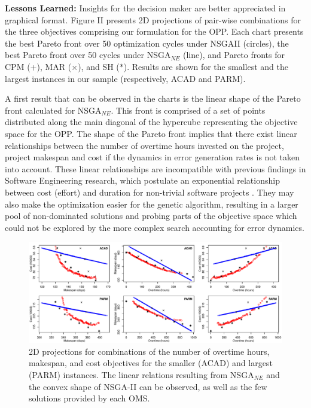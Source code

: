 \documentclass[conference]{IEEEtran}
\begin{document}
\noindent
\textbf{Lessons Learned:} Insights for the decision maker are better appreciated in graphical format. Figure II presents 2D projections of pair-wise combinations for the three objectives comprising our formulation for the OPP. Each chart presents the best Pareto front over 50 optimization cycles under NSGAII (circles), the best Pareto front over 50 cycles under NSGA$_{NE}$ (line), and Pareto fronts for CPM (+), MAR ($\times$), and SH ($\ast$). Results are shown for the smallest and the largest instances in our sample (respectively, ACAD and PARM).

A first result that can be observed in the charts is the linear shape of the Pareto front calculated for NSGA$_{NE}$. This front is comprised of a set of points distributed along the main diagonal of the hypercube representing the objective space for the OPP. The shape of the Pareto front implies that there exist linear relationships between the number of overtime hours invested on the project, project makespan and cost if the dynamics in error generation rates is not taken into account. These linear relationships are incompatible with previous findings in Software Engineering research, which postulate an exponential relationship between cost (effort) and duration for non-trivial software projects \cite{Boehm:1981}. They may also make the optimization easier for the genetic algorithm, resulting in a larger pool of non-dominated solutions and probing parts of the objective space which could not be explored by the more complex search accounting for error dynamics.

\begin{figure}
\centering
\includegraphics[scale=0.65]{2dplots.pdf}
\caption{2D projections for combinations of the number of overtime hours, makespan, and cost objectives for the smaller (ACAD) and largest (PARM) instances. The linear relations resulting from NSGA$_{NE}$ and the convex shape of NSGA-II can be observed, as well as the few solutions provided by each OMS.}
\end{figure}
\end{document}
